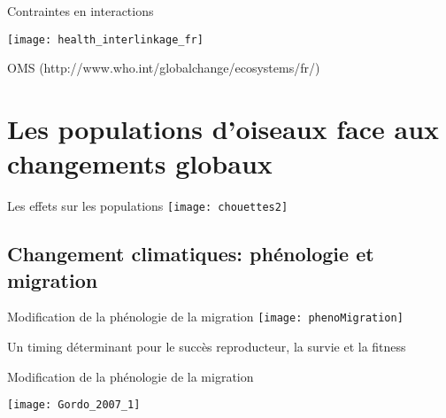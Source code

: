 \documentclass[10pt]{beamer}
\begin{document}
\begin{frame}{Contraintes en interactions}
  \begin{center}
    \texttt{[image: health\_interlinkage\_fr]} 
  \end{center}
  \begin{tiny}
  OMS (http://www.who.int/globalchange/ecosystems/fr/)
  \end{tiny}
\end{frame}


 \section[Les effets sur les populations]{Les populations d'oiseaux face aux changements globaux}

\begin{frame} {Les effets sur les populations}
 \texttt{[image: chouettes2]}
\end{frame}

\subsection{Changement climatiques: phénologie et migration} 




\begin{frame}{Modification de la phénologie de la migration}
  \texttt{[image: phenoMigration]}
  \\
  \vspace{20pt}
  \begin{center}
    Un timing déterminant pour le succès reproducteur, la survie et la fitness
  \end{center}
\end{frame}

\begin{frame}{Modification de la phénologie de la migration}
 
 \begin{center}
   \texttt{[image: Gordo\_2007\_1]}

  \end{center}
  \begin{tiny}
\cite{Gordo2007}

  \end{tiny}
\end{frame}
\end{document}

